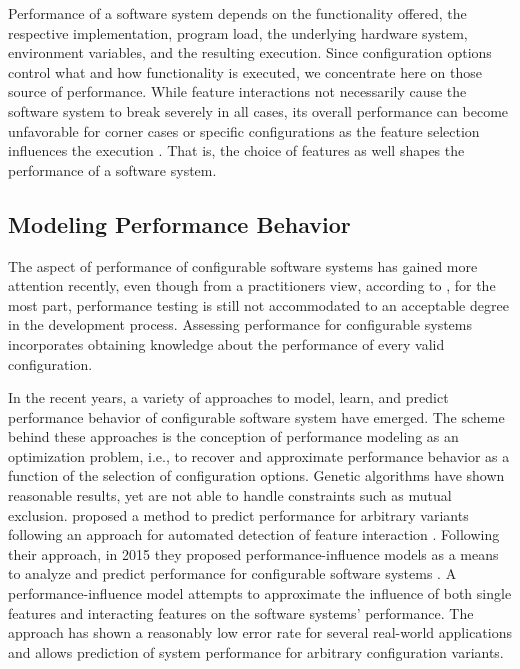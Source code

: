 Performance of a software system depends on the functionality offered, the
respective implementation, program load, the underlying hardware system,
environment variables, and the resulting execution. Since configuration options
control what and how functionality is executed, we concentrate here on those
source of performance. While feature interactions not necessarily cause the
software system to break severely in all cases, its overall performance can
become unfavorable for corner cases or specific configurations as the feature
selection influences the execution \citep{foo_mining_2010,heger_automated_2013,nguyen_industrial_2014}. 
That is, the choice of features as well shapes the performance of a software system.

\subsection{Modeling Performance Behavior}

The aspect of performance of configurable software systems has gained more
attention recently, even though from a practitioners view, according to
\cite{molyneaux_art_2014}, for the most part, performance testing is still not
accommodated to an acceptable degree in the development process.
Assessing performance for configurable systems incorporates obtaining knowledge about the performance of
every valid configuration. 

In the recent years, a variety of approaches to
model, learn, and predict performance behavior of configurable software system
have emerged. The scheme behind these approaches is the conception of
performance modeling as an optimization problem, i.e., to recover and
approximate performance behavior as a function of the selection of
configuration options.
Genetic algorithms \citep{guo_genetic_2011,sayyad_scalable_2013}  have shown
reasonable results, yet are not able to handle constraints such as mutual
exclusion.
\cite{siegmund_predicting_2012} proposed a method to predict performance for arbitrary variants following an approach for
automated detection of feature interaction \citep{siegmund_predicting_2012}.
Following their approach, in 2015 they proposed performance-influence models as a means
to analyze and predict performance for configurable software systems
\citep{siegmund_performance-influence_2015}. A performance-influence model
attempts to approximate the influence of both single features and interacting
features on the software systems' performance.
The approach has shown a reasonably low error rate for several real-world
applications and allows prediction of system performance for arbitrary
configuration variants.

